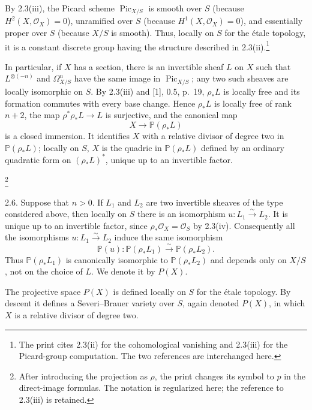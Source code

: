By 2.3(iii), the Picard scheme $\operatorname{Pic}_{X/S}$ is smooth over
$S$ (because $H^2(X,\mathcal O_X)=0$), unramified over $S$ (because
$H^1(X,\mathcal O_X)=0$), and essentially proper over $S$ (because
$X/S$ is smooth).  Thus, locally on $S$ for the \'{e}tale topology, it
is a constant discrete group having the structure described in
2.3(ii).\footnote{The print cites 2.3(ii) for the cohomological
vanishing and 2.3(iii) for the Picard-group computation.  The two
references are interchanged here.}

In particular, if $X$ has a section, there is an invertible sheaf $L$ on
$X$ such that $L^{\otimes(-n)}$ and $\Omega^n_{X/S}$ have the same image
in $\operatorname{Pic}_{X/S}$; any two such sheaves are locally
isomorphic on $S$.  By 2.3(iii) and [1], 0.5, p.~19,
$\rho_*L$ is locally free and its formation commutes with every base
change.  Hence $\rho_*L$ is locally free of rank $n+2$, the map
$\rho^*\rho_*L\longrightarrow L$ is surjective, and the canonical map
\begin{equation*}
X\longrightarrow\mathbb P(\rho_*L)
\end{equation*}
is a closed immersion.  It identifies $X$ with a relative divisor of
degree two in $\mathbb P(\rho_*L)$; locally on $S$, $X$ is the quadric in
$\mathbb P(\rho_*L)$ defined by an ordinary quadratic form on
$(\rho_*L)^*$, unique up to an invertible factor.

\footnote{After introducing the projection as $\rho$, the print changes
its symbol to $p$ in the direct-image formulas.  The notation is
regularized here; the reference to 2.3(iii) is retained.}

2.6. Suppose that $n>0$.  If $L_1$ and $L_2$ are two invertible sheaves
of the type considered above, then locally on $S$ there is an
isomorphism $u:L_1\xrightarrow{\sim}L_2$.  It is unique up to an
invertible factor, since $\rho_*\mathcal O_X=\mathcal O_S$ by 2.3(iv).
Consequently all the isomorphisms $u:L_1\xrightarrow{\sim}L_2$ induce
the same isomorphism
\begin{equation*}
\mathbb P(u):\mathbb P(\rho_*L_1)\xrightarrow{\sim}
\mathbb P(\rho_*L_2).
\end{equation*}
Thus $\mathbb P(\rho_*L_1)$ is canonically isomorphic to
$\mathbb P(\rho_*L_2)$ and depends only on $X/S$, not on the choice of
$L$.  We denote it by $P(X)$.


The projective space $P(X)$ is defined locally on $S$ for the \'{e}tale
topology.  By descent it defines a Severi--Brauer variety over $S$,
again denoted $P(X)$, in which $X$ is a relative divisor of degree two.

